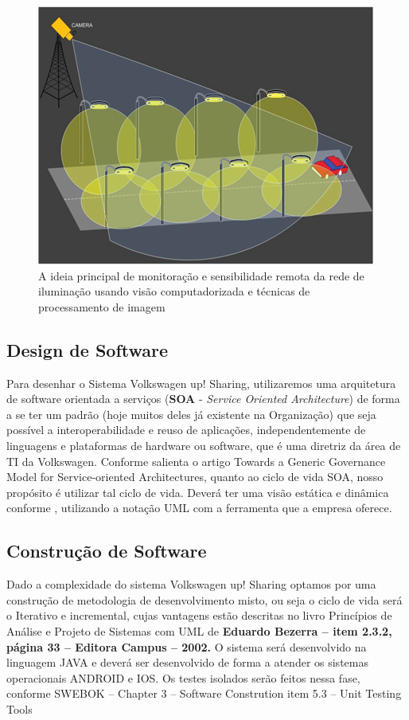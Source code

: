 \documentclass[12pt]{article}
\begin{document}
\begin{figure}[htp]
\centering
\includegraphics[scale=1.3] {swebok_requisitos.png}
\caption{A ideia principal de monitoração e sensibilidade remota da rede de iluminação usando visão computadorizada e técnicas de processamento de imagem}
\label{fig:exampleFig1}
\end{figure}

\subsection{Design de Software}

Para desenhar o Sistema Volkswagen up! Sharing, utilizaremos uma arquitetura de software orientada a serviços (\textbf{SOA} - \textit{Service Oriented Architecture}) de forma a se ter um padrão (hoje muitos deles já existente na Organização) que seja possível a interoperabilidade e reuso de aplicações, independentemente de linguagens e plataformas de hardware ou software, que é uma diretriz da área de TI da Volkswagen. Conforme salienta o artigo Towards a Generic Governance Model for Service-oriented Architectures, quanto ao ciclo de vida SOA, nosso propósito é utilizar tal ciclo de vida. 
Deverá ter uma visão estática e dinâmica conforme \cite{Bourque2014}, utilizando a notação UML com a ferramenta que a empresa oferece.




\subsection{Construção de Software}

Dado a complexidade do sistema Volkswagen up! Sharing optamos por uma construção de metodologia de desenvolvimento misto, ou seja o ciclo de vida será  o Iterativo e incremental, cujas vantagens estão descritas no livro Princípios de Análise e Projeto de Sistemas com UML de\textbf{ Eduardo Bezerra – item 2.3.2, página 33 – Editora Campus – 2002.} 
O sistema será desenvolvido na linguagem JAVA e deverá ser desenvolvido de forma a atender os sistemas operacionais ANDROID e IOS.
Os testes isolados serão feitos nessa fase, conforme SWEBOK – Chapter 3 – Software Constrution item 5.3 – Unit Testing Tools
\end{document}
